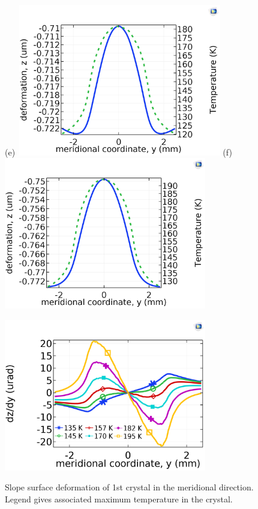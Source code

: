 \documentclass[preprint]{iucr}              %
\begin{document}
\begin{figure}
(e)~\includegraphics[width = 8.85cm]{images/110.png}
(f)~\includegraphics[width = 8.85cm]{images/115.png}
\label{fig:ydeformation}
\end{figure}

\begin{figure}
\caption{Slope surface deformation of 1st crystal in the meridional direction. Legend gives associated maximum temperature in the crystal.}
\includegraphics[width = 8.85cm]{images/slope.png}
\label{fig:yslope}
\end{figure}
\end{document}
